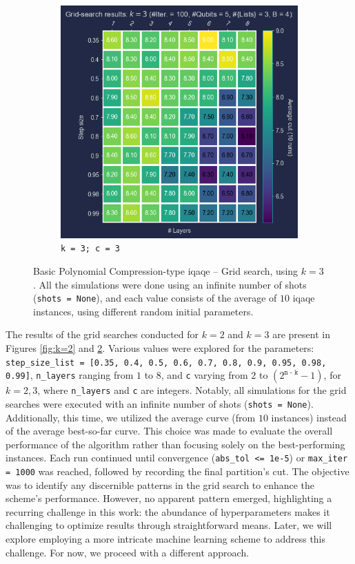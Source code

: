 \begin{figure}[ht!]
\begin{subfigure}[b]{0.475\textwidth}
      \includegraphics[width=1\textwidth]{Figures/Chapter_5/k=3(Grid_search)/iQAQE_k3_Grid_Search_step_size_n_layers_c=3.png}
      \caption{\texttt{k = 3; c = 3}}
      \label{fig:k=3;c=3}
  \end{subfigure}
  \caption{Basic Polynomial Compression-type \acrshort{iqaqe} – Grid search, using $k=3$. All the simulations were done using an infinite number of shots (\texttt{shots = None}), and each value consists of the average of $10$ \acrshort{iqaqe} instances, using different random initial parameters.}
  \label{fig:k=3}
\end{figure}

The results of the grid searches conducted for $k=2$ and $k=3$ are present in Figures \ref{fig:k=2} and \ref{fig:k=3}. Various values were explored for the parameters: \texttt{step\_size\_list = [0.35, 0.4, 0.5, 0.6, 0.7, 0.8, 0.9, 0.95, 0.98, 0.99]}, \texttt{n\_layers} ranging from $1$ to $8$, and \texttt{c} varying from $2$ to $(2^{\texttt{n - k}} - 1)$, for $k=2, 3$, where \texttt{n\_layers} and \texttt{c} are integers. Notably, all simulations for the grid searches were executed with an infinite number of shots (\texttt{shots = None}). Additionally, this time, we utilized the average curve (from $10$ instances) instead of the average best-so-far curve. This choice was made to evaluate the overall performance of the algorithm rather than focusing solely on the best-performing instances. Each run continued until convergence (\texttt{abs\_tol <= 1e-5}) or \texttt{max\_iter = 1000} was reached, followed by recording the final partition's cut. The objective was to identify any discernible patterns in the grid search to enhance the scheme's performance. However, no apparent pattern emerged, highlighting a recurring challenge in this work: the abundance of hyperparameters makes it challenging to optimize results through straightforward means. Later, we will explore employing a more intricate machine learning scheme to address this challenge. For now, we proceed with a different approach.

